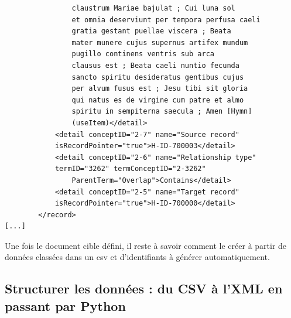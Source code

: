 \documentclass[a4paper,12pt,twoside]{book}
\begin{document}
\begin{verbatim}
                claustrum Mariae bajulat ; Cui luna sol
                et omnia deserviunt per tempora perfusa caeli 
                gratia gestant puellae viscera ; Beata
                mater munere cujus supernus artifex mundum
                pugillo continens ventris sub arca
                clausus est ; Beata caeli nuntio fecunda 
                sancto spiritu desideratus gentibus cujus
                per alvum fusus est ; Jesu tibi sit gloria 
                qui natus es de virgine cum patre et almo
                spiritu in sempiterna saecula ; Amen [Hymn]
                (useItem)</detail>
            <detail conceptID="2-7" name="Source record" 
            isRecordPointer="true">H-ID-700003</detail>
            <detail conceptID="2-6" name="Relationship type"
            termID="3262" termConceptID="2-3262"
                ParentTerm="Overlap">Contains</detail>
            <detail conceptID="2-5" name="Target record" 
            isRecordPointer="true">H-ID-700000</detail>
        </record>
[...]
\end{verbatim}

Une fois le document cible défini, il reste à savoir comment le créer à partir de données classées dans un csv et d'identifiants à générer automatiquement.


	\subsection{Structurer les données : du CSV à l’XML en passant par Python}
	
\end{document}
